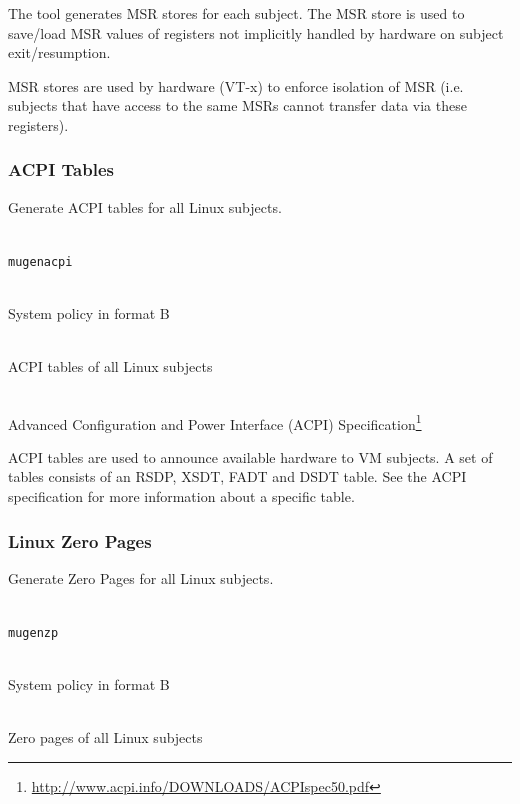 \documentclass[a4paper,twoside,titlepage]{article}
\begin{document}
The tool generates MSR stores for each subject. The MSR store is used to
save/load MSR values of registers not implicitly handled by hardware on subject
exit/resumption.

MSR stores are used by hardware (VT-x) to enforce isolation of MSR (i.e.
subjects that have access to the same MSRs cannot transfer data via these
registers).

\subsubsection{ACPI Tables}
Generate ACPI tables for all Linux subjects.

\begin{description} \itemsep1pt \parskip0pt
	\item[Name] \hfill \\
		\texttt{mugenacpi}
	\item[Input] \hfill \\
		System policy in format B
	\item[Output] \hfill \\
		ACPI tables of all Linux subjects
	\item[Output format] \hfill \\
		Advanced Configuration and Power Interface (ACPI)
		Specification\footnote{\url{http://www.acpi.info/DOWNLOADS/ACPIspec50.pdf}}
\end{description}

ACPI tables are used to announce available hardware to VM subjects. A set of
tables consists of an RSDP, XSDT, FADT and DSDT table. See the ACPI
specification for more information about a specific table.

\subsubsection{Linux Zero Pages}
Generate Zero Pages for all Linux subjects.

\begin{description} \itemsep1pt \parskip0pt
	\item[Name] \hfill \\
		\texttt{mugenzp}
	\item[Input] \hfill \\
		System policy in format B
	\item[Output] \hfill \\
		Zero pages of all Linux subjects
\end{description}
\end{document}
